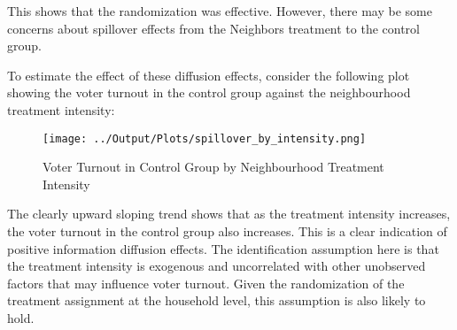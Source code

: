 \documentclass[11pt]{article}
\begin{document}
This shows that the randomization was effective. However, there may be some concerns about spillover effects from the Neighbors treatment to the control group. 

To estimate the effect of these diffusion effects, consider the following plot showing the voter turnout in the control group against the neighbourhood treatment intensity:
\begin{figure}[H]
    \centering
    \texttt{[image: ../Output/Plots/spillover\_by\_intensity.png]}   
    \caption{Voter Turnout in Control Group by Neighbourhood Treatment Intensity}
    \label{fig:figure2}
\end{figure}

The clearly upward sloping trend shows that as the treatment intensity increases, the voter turnout in the control group also increases. This is a clear indication of positive information diffusion effects. The identification assumption here is that the treatment intensity is exogenous and uncorrelated with other unobserved factors that may influence voter turnout. Given the randomization of the treatment assignment at the household level, this assumption is also likely to hold.
\end{document}
